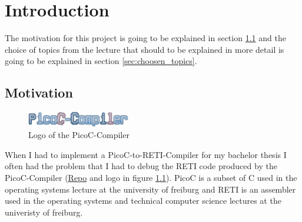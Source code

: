 \documentclass{report}
\begin{document}
\fontsize{10pt}{11pt}\selectfont




\tableofcontents
\thispagestyle{empty}
\clearpage
\pagestyle{plain}

\listoffigures
\newpage
\listoftables

\clearpage
{}
\pagestyle{default}

\chapter{Introduction}
\label{sec:introduction}

The motivation for this project is going to be explained in section \ref{sec:motivation} and the choice of topics from the lecture that should to be explained in more detail is going to be explained in section \ref{sec:choosen_topics}.

\section{Motivation}
\label{sec:motivation}

\begin{figure}
	\centering
	\includegraphics[width=0.4\textwidth]{./figures/picoc_compiler.png}
	\caption{Logo of the PicoC-Compiler}
	\label{fig:logo of the picoc compiler}
  \vspace{0.25cm}
\end{figure}

When I had to implement a PicoC-to-RETI-Compiler for my bachelor thesis I often had the problem that I had to debug the RETI code produced by the \alert{PicoC-Compiler} (\href{https://github.com/matthejue/PicoC-Compiler/tree/missing_semester_project}{Repo} and logo in figure \ref{fig:logo of the picoc compiler}). \alert{PicoC} is a subset of C used in the operating systems lecture at the university of freiburg and \alert{RETI} is an assembler used in the operating systems and technical computer science lectures at the univeristy of freiburg.
\end{document}
